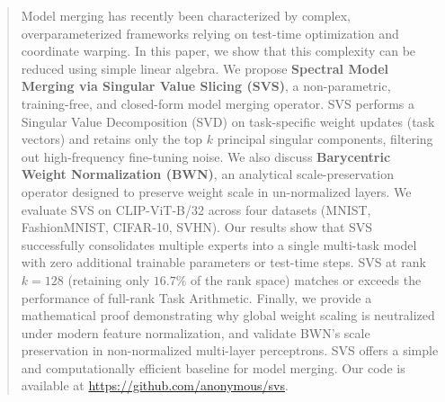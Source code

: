 \begin{abstract}
Model merging has recently been characterized by complex, overparameterized frameworks relying on test-time optimization and coordinate warping. In this paper, we show that this complexity can be reduced using simple linear algebra. We propose \textbf{Spectral Model Merging via Singular Value Slicing (SVS)}, a non-parametric, training-free, and closed-form model merging operator. SVS performs a Singular Value Decomposition (SVD) on task-specific weight updates (task vectors) and retains only the top $k$ principal singular components, filtering out high-frequency fine-tuning noise. We also discuss \textbf{Barycentric Weight Normalization (BWN)}, an analytical scale-preservation operator designed to preserve weight scale in un-normalized layers. We evaluate SVS on CLIP-ViT-B/32 across four datasets (MNIST, FashionMNIST, CIFAR-10, SVHN). Our results show that SVS successfully consolidates multiple experts into a single multi-task model with zero additional trainable parameters or test-time steps. SVS at rank $k=128$ (retaining only $16.7\%$ of the rank space) matches or exceeds the performance of full-rank Task Arithmetic. Finally, we provide a mathematical proof demonstrating why global weight scaling is neutralized under modern feature normalization, and validate BWN's scale preservation in non-normalized multi-layer perceptrons. SVS offers a simple and computationally efficient baseline for model merging. Our code is available at \url{https://github.com/anonymous/svs}.
\end{abstract}
